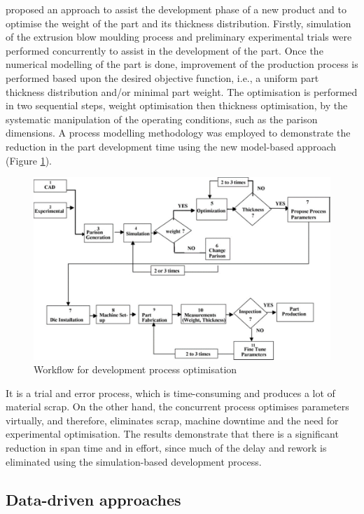 \citet{attar2008manufacturing} proposed an approach to assist the development phase of a new product and to optimise the weight of the part and its thickness distribution. Firstly, simulation of the extrusion blow moulding process and preliminary experimental trials were performed concurrently to assist in the development of the part. Once the numerical modelling of the part is done, improvement of the production process is performed based upon the desired objective function, i.e., a uniform part thickness distribution and/or minimal part weight. The optimisation is performed in two sequential steps, weight optimisation then thickness optimisation, by the systematic manipulation of the operating conditions, such as the parison dimensions. A process modelling methodology was employed to demonstrate the reduction in the part development time using the new model-based approach (Figure \ref{fig:workflow_development_process_optimisation}).
\begin{figure}
\centerline{\includegraphics[scale=0.6]{images/chapter_2/optimisation_flow.png}}
\caption{Workflow for development process optimisation \citep{attar2008manufacturing}}
\label{fig:workflow_development_process_optimisation}
\end{figure}
It is a trial and error process, which is time-consuming and produces a lot of material scrap. On the other hand, the concurrent process optimises parameters virtually, and therefore, eliminates scrap, machine downtime and the need for experimental optimisation. The results demonstrate that there is a significant reduction in span time and in effort, since much of the delay and rework is eliminated using the simulation-based development process.


\subsection{Data-driven approaches} \label{Data-driven approaches}

